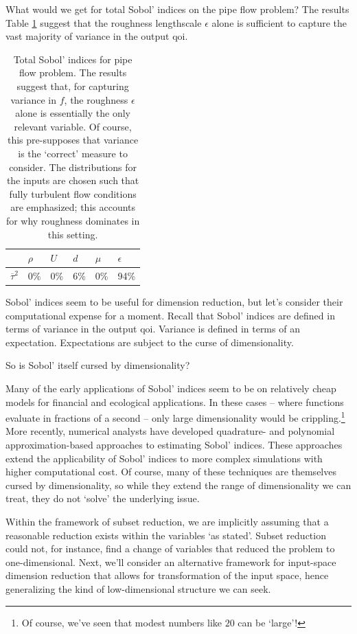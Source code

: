 \documentclass{article}
\begin{document}
What would we get for total Sobol' indices on the pipe flow problem? The results
Table \ref{tab:pipe-sobol} suggest that the roughness lengthscale $\epsilon$
alone is sufficient to capture the vast majority of variance in the output qoi.

\begin{table}[!ht]
  \centering
  \begin{tabular}{@{}llllll@{}}
   & $\rho$ & $U$ & $d$ & $\mu$ & $\epsilon$\\
  \hline
  $\overline{\tau}^2$ & 0\% & 0\% & 6\% & 0\% & 94\% \\
  \end{tabular}
  \caption{Total Sobol' indices for pipe flow problem. The results suggest that,
    for capturing variance in $f$, the roughness $\epsilon$ alone is essentially
    the only relevant variable. Of course, this pre-supposes that variance is
    the `correct' measure to consider. The distributions for the inputs are
    chosen such that fully turbulent flow conditions are emphasized; this
    accounts for why roughness dominates in this setting.}
  \label{tab:pipe-sobol}
\end{table}

Sobol' indices seem to be useful for dimension reduction, but let's consider
their computational expense for a moment. Recall that Sobol' indices are defined
in terms of variance in the output qoi. Variance is defined in terms of an
expectation. Expectations are subject to the curse of dimensionality.

\bigskip
So is Sobol' itself cursed by dimensionality?

\bigskip
Many of the early applications of Sobol' indices seem to be on relatively cheap
models for financial and ecological applications.\cite{saltelli2004sensitivity}
In these cases -- where functions evaluate in fractions of a second -- only
large dimensionality would be crippling.\footnote{Of course, we've seen that
  modest numbers like $20$ can be `large'!} More recently, numerical analysts
have developed quadrature- and polynomial approximation-based approaches to
estimating Sobol' indices.\cite{sudret2008global,seshadri2017effectively} These
approaches extend the applicability of Sobol' indices to more complex
simulations with higher computational cost. Of course, many of these techniques
are themselves cursed by dimensionality, so while they extend the range of
dimensionality we can treat, they do not `solve' the underlying issue.

Within the framework of subset reduction, we are implicitly assuming that a
reasonable reduction exists within the variables `as stated'. Subset reduction
could not, for instance, find a change of variables that reduced the problem to
one-dimensional. Next, we'll consider an alternative framework for input-space
dimension reduction that allows for transformation of the input space, hence
generalizing the kind of low-dimensional structure we can seek.
\end{document}
